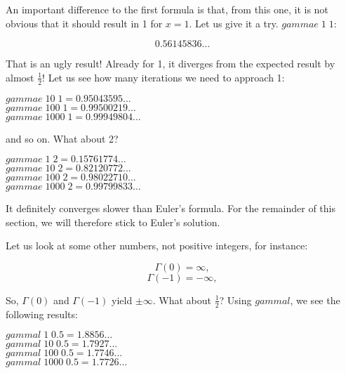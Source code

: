 \documentclass[tikz]{scrreprt}
\newcommand{\Varid}[1]{\mathit{#1}}
\begin{document}
An important difference to the first formula is
that, from this one, it is not obvious that it
should result in 1 for $x=1$. Let us give it a try.
\ensuremath{\Varid{gammae}\;\mathrm{1}\;\mathrm{1}}:

\[
0.56145836\dots
\]

That is an ugly result! Already for 1, it
diverges from the expected result by almost $\frac{1}{2}$!
Let us see how many iterations we need to approach 1:

\ensuremath{\Varid{gammae}\;\mathrm{10}\;\mathrm{1}\mathrel{=}\mathrm{0.95043595}\mathbin{...}}\\
\ensuremath{\Varid{gammae}\;\mathrm{100}\;\mathrm{1}\mathrel{=}\mathrm{0.99500219}\mathbin{...}}\\
\ensuremath{\Varid{gammae}\;\mathrm{1000}\;\mathrm{1}\mathrel{=}\mathrm{0.99949804}\mathbin{...}}

and so on. What about 2?

\ensuremath{\Varid{gammae}\;\mathrm{1}\;\mathrm{2}\mathrel{=}\mathrm{0.15761774}\mathbin{...}}\\
\ensuremath{\Varid{gammae}\;\mathrm{10}\;\mathrm{2}\mathrel{=}\mathrm{0.82120772}\mathbin{...}}\\
\ensuremath{\Varid{gammae}\;\mathrm{100}\;\mathrm{2}\mathrel{=}\mathrm{0.98022710}\mathbin{...}}\\
\ensuremath{\Varid{gammae}\;\mathrm{1000}\;\mathrm{2}\mathrel{=}\mathrm{0.99799833}\mathbin{...}}

It definitely converges slower than Euler's formula.
For the remainder of this section, we will therefore stick
to Euler's solution.

Let us look at some other numbers,
not positive
integers, for instance:

\begin{minipage}{\textwidth}
\[
\Gamma(0) = \infty,
\]
\[
\Gamma(-1) = -\infty,
\]
\end{minipage}

So, $\Gamma(0)$ and $\Gamma(-1)$ yield $\pm\infty$.
What about $\frac{1}{2}$?
Using \ensuremath{\Varid{gammal}}, we see the following results:

\begin{minipage}{\textwidth}
\ensuremath{\Varid{gammal}\;\mathrm{1}\;\mathrm{0.5}\mathrel{=}\mathrm{1.8856}\mathbin{...}}\\
\ensuremath{\Varid{gammal}\;\mathrm{10}\;\mathrm{0.5}\mathrel{=}\mathrm{1.7927}\mathbin{...}}\\
\ensuremath{\Varid{gammal}\;\mathrm{100}\;\mathrm{0.5}\mathrel{=}\mathrm{1.7746}\mathbin{...}}\\
\ensuremath{\Varid{gammal}\;\mathrm{1000}\;\mathrm{0.5}\mathrel{=}\mathrm{1.7726}\mathbin{...}}\\
\end{minipage}
\end{document}
